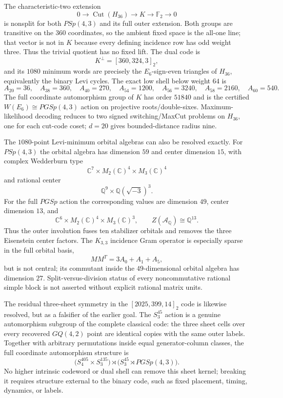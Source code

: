 The characteristic-two extension
\[
0\longrightarrow \operatorname{Cut}(H_{36})
\longrightarrow K\longrightarrow \mathbb F_2\longrightarrow0
\]
is nonsplit for both $PSp(4,3)$ and its full outer extension.  Both groups are transitive on the $360$ coordinates, so the ambient fixed space is the all-one line; that vector is not in $K$ because every defining incidence row has odd weight three.  Thus the trivial quotient has no fixed lift.  The dual code is
\[
K^\perp=[360,324,3]_2,
\]
and its $1080$ minimum words are precisely the $E_6$-sign-even triangles of $H_{36}$, equivalently the binary Levi cycles.  The exact low shell below weight $64$ is
\[
A_{20}=36,\quad A_{38}=360,\quad A_{40}=270,\quad
A_{54}=1200,\quad A_{56}=3240,\quad A_{58}=2160,\quad A_{60}=540.
\]
The full coordinate automorphism group of $K$ has order $51840$ and is the certified $W(E_6)\cong PGSp(4,3)$ action on projective roots/double-sixes.  Maximum-likelihood decoding reduces to two signed switching/MaxCut problems on $H_{36}$, one for each cut-code coset; $d=20$ gives bounded-distance radius nine.

The $1080$-point Levi-minimum orbital algebras can also be resolved exactly.  For $PSp(4,3)$ the orbital algebra has dimension $59$ and center dimension $15$, with complex Wedderburn type
\[
\mathbb C^7\times M_2(\mathbb C)^4\times M_3(\mathbb C)^4
\]
and rational center
\[
\mathbb Q^9\times\mathbb Q(\sqrt{-3})^3.
\]
For the full $PGSp$ action the corresponding values are dimension $49$, center dimension $13$, and
\[
\mathbb C^6\times M_2(\mathbb C)^4\times M_3(\mathbb C)^3,
\qquad
Z(\mathcal A_{\mathbb Q})\cong\mathbb Q^{13}.
\]
Thus the outer involution fuses ten stabilizer orbitals and removes the three Eisenstein center factors.  The $K_{3,3}$ incidence Gram operator is especially sparse in the full orbital basis,
\[
MM^T=3A_0+A_1+A_5,
\]
but is not central; its commutant inside the $49$-dimensional orbital algebra has dimension $27$.  Split-versus-division status of every noncommutative rational simple block is not asserted without explicit rational matrix units.

The residual three-sheet symmetry in the $[2025,399,14]_2$ code is likewise resolved, but as a falsifier of the earlier goal.  The $S_3^{45}$ action is a genuine automorphism subgroup of the complete classical code: the three sheet cells over every recovered $GQ(4,2)$ point are identical copies with the same outer labels.  Together with arbitrary permutations inside equal generator-column classes, the full coordinate automorphism structure is
\[
\bigl(S_4^{405}\times S_3^{135}\bigr)
\rtimes
\bigl(S_3^{45}\rtimes PGSp(4,3)\bigr).
\]
No higher intrinsic codeword or dual shell can remove this sheet kernel; breaking it requires structure external to the binary code, such as fixed placement, timing, dynamics, or labels.

